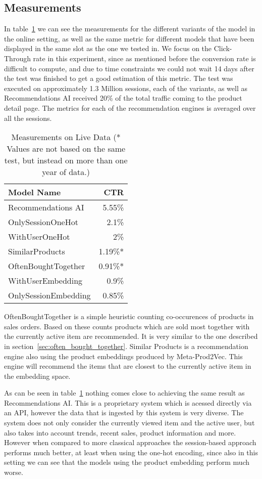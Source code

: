 \subsection{Measurements}
In table~\ref{tab:online_measurements} we can see the measurements for the different variants of the model in the online setting, as well as the same metric for different models that have been displayed in the same slot as the one we tested in.
We focus on the Click-Through rate in this experiment, since as mentioned before the conversion rate is difficult to compute, and due to time constraints we could not wait 14 days after the test was finished to get a good estimation of this metric.
The test was executed on approximately 1.3 Million sessions, each of the variants, as well as Recommendations AI received 20\% of the total traffic coming to the product detail page.
The metrics for each of the recommendation engines is averaged over all the sessions.
\begin{table}[t]
    \centering
    \begin{tabular}{lr}\toprule
        \textbf{Model Name} & \textbf{CTR} \\ \midrule
        Recommendations AI & 5.55\% \\
        OnlySessionOneHot & 2.1\% \\
        WithUserOneHot & 2\% \\
        SimilarProducts & 1.19\%* \\
        OftenBoughtTogether & 0.91\%* \\
        WithUserEmbedding & 0.9\% \\
        OnlySessionEmbedding & 0.85\% \\ \bottomrule
    \end{tabular}
    \caption{Measurements on Live Data (* Values are not based on the same test, but instead on more than one year of data.)}
    \label{tab:online_measurements}
\end{table}
\par
OftenBoughtTogether is a simple heuristic counting co-occurences of products in sales orders.
Based on these counts products which are sold most together with the currently active item are recommended.
It is very similar to the one described in section~\ref{sec:often_bought_together}.
Similar Products is a recommendation engine also using the product embeddings produced by Meta-Prod2Vec.
This engine will recommend the items that are closest to the currently active item in the embedding space.
\par
As can be seen in table~\ref{tab:online_measurements} nothing comes close to achieving the same result as Recommendations AI.
This is a proprietary system which is acessed directly via an API, however the data that is ingested by this system is very diverse.
The system does not only consider the currently viewed item and the active user, but also takes into account trends, recent sales, product information and more.
However when compared to more classical approaches the session-based approach performs much better, at least when using the one-hot encoding, since also in this setting we can see that the models using the product embedding perform much worse.